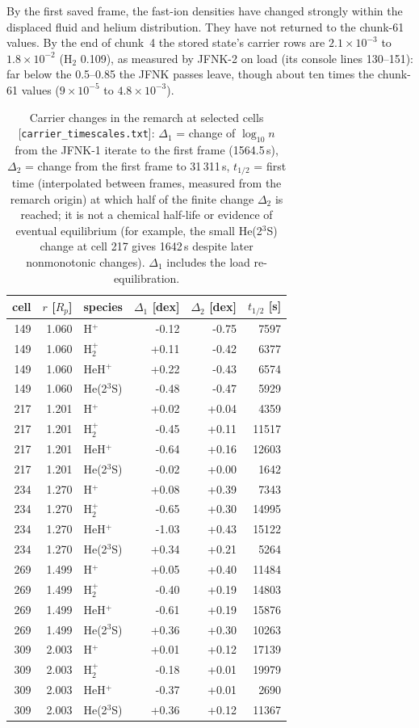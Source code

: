 \documentclass[english,a4paper]{my_memo}
\newcommand{\Rp}{R_p}
\begin{document}
By the first saved frame, the fast-ion densities have changed strongly
within the displaced fluid and helium distribution. They have not returned
to the chunk-61 values. By the end
of chunk~4 the stored state's carrier rows are $2.1\times10^{-3}$ to
$1.8\times10^{-2}$ (H$_2$ 0.109), as measured by JFNK-2 on load (its console
lines 130--151): far below the 0.5--0.85 the JFNK passes leave, though about
ten times the chunk-61 values ($9\times10^{-5}$ to $4.8\times10^{-3}$).

\begin{table}[!htbp]
\centering\small
\caption{Carrier changes in the remarch at selected cells
[\texttt{carrier\_timescales.txt}]: $\Delta_1$ = change of $\log_{10}n$ from the JFNK-1 iterate to the first frame (1564.5\,s),
$\Delta_2$ = change from the first frame to 31\,311\,s, $t_{1/2}$ = first time (interpolated between frames, measured from the remarch origin) at which half of the finite change $\Delta_2$ is reached;
it is not a chemical half-life or evidence of eventual equilibrium (for example, the small He(2$^3$S) change at cell 217 gives 1642\,s
despite later nonmonotonic changes). $\Delta_1$ includes the load re-equilibration.}
\label{tab:carr}
\begin{tabular}{rrlrrr}
\toprule
cell & $r$ [$\Rp$] & species & $\Delta_1$ [dex] & $\Delta_2$ [dex] & $t_{1/2}$ [s] \\
\midrule
149 & 1.060 & H$^+$ & -0.12 & -0.75 & 7597 \\
149 & 1.060 & H$_2^+$ & +0.11 & -0.42 & 6377 \\
149 & 1.060 & HeH$^+$ & +0.22 & -0.43 & 6574 \\
149 & 1.060 & He(2$^3$S) & -0.48 & -0.47 & 5929 \\
217 & 1.201 & H$^+$ & +0.02 & +0.04 & 4359 \\
217 & 1.201 & H$_2^+$ & -0.45 & +0.11 & 11517 \\
217 & 1.201 & HeH$^+$ & -0.64 & +0.16 & 12603 \\
217 & 1.201 & He(2$^3$S) & -0.02 & +0.00 & 1642 \\
234 & 1.270 & H$^+$ & +0.08 & +0.39 & 7343 \\
234 & 1.270 & H$_2^+$ & -0.65 & +0.30 & 14995 \\
234 & 1.270 & HeH$^+$ & -1.03 & +0.43 & 15122 \\
234 & 1.270 & He(2$^3$S) & +0.34 & +0.21 & 5264 \\
269 & 1.499 & H$^+$ & +0.05 & +0.40 & 11484 \\
269 & 1.499 & H$_2^+$ & -0.40 & +0.19 & 14803 \\
269 & 1.499 & HeH$^+$ & -0.61 & +0.19 & 15876 \\
269 & 1.499 & He(2$^3$S) & +0.36 & +0.30 & 10263 \\
309 & 2.003 & H$^+$ & +0.01 & +0.12 & 17139 \\
309 & 2.003 & H$_2^+$ & -0.18 & +0.01 & 19979 \\
309 & 2.003 & HeH$^+$ & -0.37 & +0.01 & 2690 \\
309 & 2.003 & He(2$^3$S) & +0.36 & +0.12 & 11367 \\
\bottomrule
\end{tabular}
\end{table}
\end{document}
